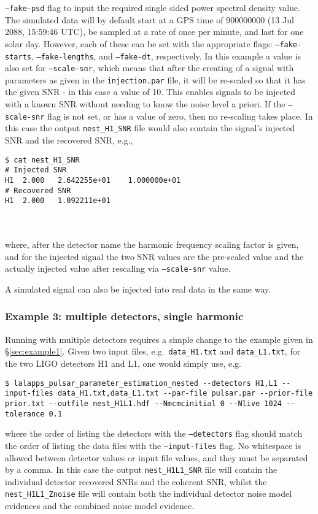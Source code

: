 {\tt --fake-psd} flag to input the required single sided power spectral density value. The simulated data will by default start at a GPS time of 900000000
(13 Jul 2088, 15:59:46 UTC), be sampled at a rate of once per minute, and last for one solar day. However, each of these can be set with the appropriate flags:
{\tt --fake-starts}, {\tt --fake-lengths}, and {\tt --fake-dt}, respectively. In this example a value is also set for {\tt --scale-snr}, which means that after the
creating of a signal with parameters as given in the {\tt injection.par} file, it will be re-scaled so that it has the given SNR - in this case a value of 10. This
enables signals to be injected with a known SNR without needing to know the noise level a priori. If the {\tt --scale-snr} flag is not set, or has a value of zero,
then no re-scaling takes place. In this case the output {\tt nest\_H1\_SNR} file would also contain the signal's injected SNR and the recovered SNR, e.g.,
\begin{lrbox}{\Lst}
\begin{lstlisting}
$ cat nest_H1_SNR
# Injected SNR
H1	2.000	2.642255e+01	1.000000e+01
# Recovered SNR
H1	2.000	1.092211e+01
\end{lstlisting}
\end{lrbox}
\\[5pt] \indent \fbox{\usebox{\Lst}} \\[5pt]
where, after the detector name the harmonic frequency scaling factor is given, and for the injected signal the two SNR values are the pre-scaled value
and the actually injected value after rescaling via {\tt --scale-snr} value.

A simulated signal can also be injected into real data in the same way.

\subsubsection{Example 3: multiple detectors, single harmonic}

Running with multiple detectors requires a simple change to the example given in \S\ref{sec:example1}. Given two input files, e.g.\ {\tt data\_H1.txt}
and {\tt data\_L1.txt}, for the two LIGO detectors H1 and L1, one would simply use, e.g.\
\begin{lstlisting}[frame=single]
$ lalapps_pulsar_parameter_estimation_nested --detectors H1,L1 --input-files data_H1.txt,data_L1.txt --par-file pulsar.par --prior-file prior.txt --outfile nest_H1L1.hdf --Nmcmcinitial 0 --Nlive 1024 --tolerance 0.1
\end{lstlisting}
where the order of listing the detectors with the {\tt --detectors} flag should match the order of listing the data files with the {\tt --input-files} flag.
No whitespace is allowed between detector values or input file values, and they must be separated by a comma. In this case the output {\tt nest\_H1L1\_SNR} file
will contain the individual detector recovered SNRs and the coherent SNR, whilst the {\tt nest\_H1L1\_Znoise} file will contain both the individual detector
noise model evidences and the combined noise model evidence.

